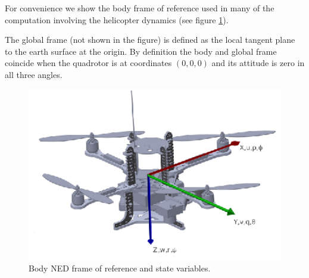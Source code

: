 \documentclass[a4paper,11pt]{report}
\begin{document}
For convenience we show the body frame of reference used in many of the computation involving the helicopter dynamics (see figure \ref{fig:axes}).
 
The global frame (not shown in the figure) is defined as the local tangent plane to the earth surface at the origin. 
By definition the body and global frame coincide when the quadrotor is at coordinates $(0,0,0)$ and its attitude is zero in all three angles.
\begin{figure}[htbp]
 \begin{center}
 \includegraphics[width=13cm]{./axes.eps}
\caption{Body NED frame of reference and state variables.\label{fig:axes}}
\end{center}
\end{figure} 
\end{document}
